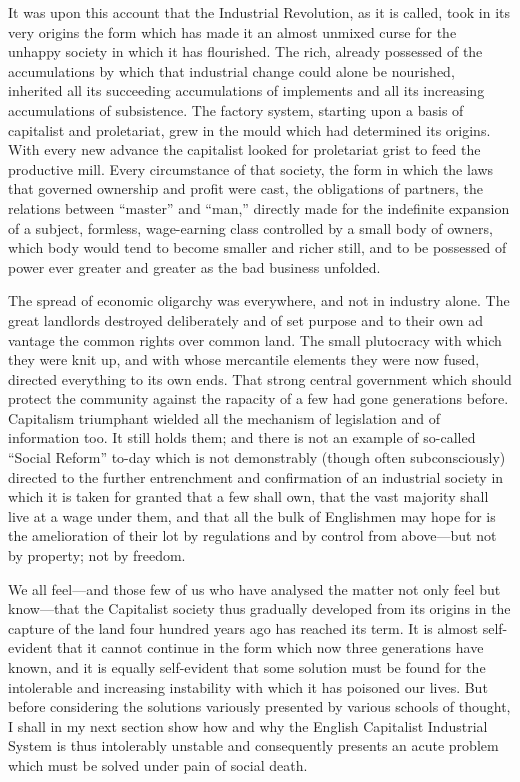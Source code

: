 \documentclass{book}
\begin{document}
It was upon this account that the Industrial Revolution, as it is called, took in its very origins the form which has made it an almost unmixed curse for the unhappy society in which it has flourished. The rich, already possessed of the accumulations by which that industrial change could alone be nourished, inherited all its succeeding accumulations of implements and all its increasing accumulations of subsistence. The factory system, starting upon a basis of capitalist and proletariat, grew in the mould which had determined its origins. With every new advance the capitalist looked for proletariat grist to feed the productive mill. Every circumstance of that society, the form in which the laws that governed ownership and profit were cast, the obligations of partners, the relations between “master” and “man,” directly made for the indefinite expansion of a subject, formless, wage-earning class controlled by a small body of owners, which body would tend to become smaller and richer still, and to be possessed of power ever greater and greater as the bad business unfolded.

The spread of economic oligarchy was everywhere, and not in industry alone. The great landlords destroyed deliberately and of set purpose and to their own ad vantage the common rights over common land. The small plutocracy with which they were knit up, and with whose mercantile elements they were now fused, directed everything to its own ends. That strong central government which should protect the community against the rapacity of a few had gone generations before. Capitalism triumphant wielded all the mechanism of legislation and of information too. It still holds them; and there is not an example of so-called “Social Reform” to-day which is not demonstrably (though often subconsciously) directed to the further entrenchment and confirmation of an industrial society in which it is taken for granted that a few shall own, that the vast majority shall live at a wage under them, and that all the bulk of Englishmen may hope for is the amelioration of their lot by regulations and by control from above—but not by property; not by freedom.

We all feel—and those few of us who have analysed the matter not only feel but know—that the Capitalist society thus gradually developed from its origins in the capture of the land four hundred years ago has reached its term. It is almost self-evident that it cannot continue in the form which now three generations have known, and it is equally self-evident that some solution must be found for the intolerable and increasing instability with which it has poisoned our lives. But before considering the solutions variously presented by various schools of thought, I shall in my next section show how and why the English Capitalist Industrial System is thus intolerably unstable and consequently presents an acute problem which must be solved under pain of social death.
\end{document}
